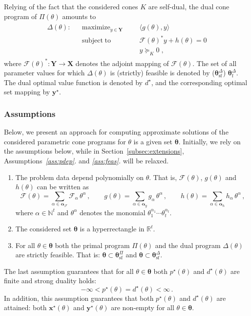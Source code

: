 \documentclass{article}
\DeclareMathOperator*{\maximize}{maximize}
\DeclareMathOperator*{\subj}{subject\;to}
\newcommand{\N}{\mathbb{N}}         %
\newcommand{\R}{\mathbb{R}}         %
\newcommand{\opt}{\star}                    %
\newcommand{\adj}{\ast}                     %
\newcommand{\feas}{\mathrm{f}}              %
\newcommand{\strfeas}{\mathrm{sf}}          %
\newcommand{\ppar}{\theta}                          %
\newcommand{\Ppar}{{\bm{\theta}}}                   %
\newcommand{\X}{\mathbf{X}}                         %
\newcommand{\Y}{\mathbf{Y}}                         %
\newcommand{\calF}{\mathcal{F}}                     %
\newcommand{\Pstrfeas}{\Ppar^\Pi_\strfeas}          %
\newcommand{\Dfeas}{\Ppar^\Delta_\feas}             %
\newcommand{\Dstrfeas}{\Ppar^\Delta_\strfeas}       %
\newcommand{\Alpha}{\bm{\alpha}}    %
\begin{document}
Relying of the fact that the considered cones $K$ are self-dual, the dual cone program of $\Pi(\ppar)$ amounts to
\begin{gather}\label{eq:parametric_dual}
\begin{aligned}
\Delta(\ppar): && \maximize_{y\in\Y} &&& \langle g(\ppar) , y \rangle\\
               && \subj              &&& \calF(\ppar)^* y + h(\ppar)= 0\\
               &&                    &&& y \succeq_K 0  \;,
\end{aligned}
\end{gather}
where $\calF(\ppar)^\adj: \Y\rightarrow\X$ denotes the adjoint mapping of $\calF(\ppar)$. The set of all parameter values for which $\Delta(\ppar)$ is (strictly) feasible is denoted by ($\Dstrfeas$) $\Dfeas$. The dual optimal value function is denoted by $d^\opt$, and the corresponding optimal set mapping by $\bm{y}^\opt$.


\subsubsection{Assumptions}

Below, we present an approach for computing approximate solutions of the considered parametric cone programs for $\ppar$ is a given set $\Ppar$. Initially, we rely on the assumptions below, while in Section~\ref{subsec:extensions}, Assumptions~{\it{}\ref{ass:pdep}.} and {\it{}\ref{ass:feas}.} will be relaxed.
\begin{enumerate}[\it\text{A}1.]
\item\label{ass:pdep} The problem data depend polynomially on $\ppar$. That is, $\calF(\ppar)$, $g(\ppar)$ and $h(\ppar)$ can be written as
    \begin{equation}\label{eq:pdep}
       \calF(\ppar) = \sum_{\alpha\in\Alpha_\calF} \calF_\alpha \, \ppar^\alpha \,,\qquad%
       g(\ppar)     = \sum_{\alpha\in\Alpha_g}         g_\alpha \, \ppar^\alpha \,,\qquad%
       h(\ppar)     = \sum_{\alpha\in\Alpha_h}         h_\alpha \, \ppar^\alpha \,,%
    \end{equation}
    where $\alpha\in\N^t$ and $\ppar^\alpha$ denotes the monomial $\ppar_1^{\alpha_1} \cdots \ppar_t^{\alpha_t}$.
\item\label{ass:Ppar} The considered set $\Ppar$ is a hyperrectangle in $\R^t$.
\item\label{ass:feas} For all $\ppar\in\Ppar$ both the primal program $\Pi(\ppar)$ and the dual program $\Delta(\ppar)$ are strictly feasible. That is: $\Ppar\subset\Pstrfeas$ and $\Ppar\subset\Dstrfeas$.
\end{enumerate}
The last assumption guarantees that for all $\ppar\in\Ppar$ both $p^\opt(\ppar)$ and $d^\opt(\ppar)$ are finite and strong duality holds:
\[ -\infty < p^\opt(\ppar) = d^\opt(\ppar) < \infty \,.%
\]
In addition, this assumption guarantees that both $p^\opt(\ppar)$ and $d^\opt(\ppar)$ are attained: both $\bm{x}^\opt(\ppar)$ and $\bm{y}^\opt(\ppar)$ are non-empty for all $\ppar\in\Ppar$.
\end{document}
